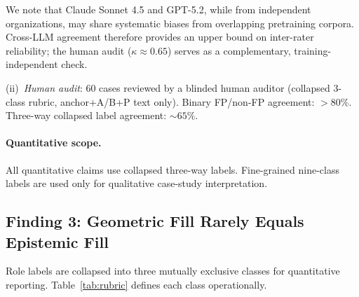 \documentclass[11pt,twocolumn]{article}
\begin{document}
We note that Claude Sonnet 4.5 and GPT-5.2, while from independent organizations,
may share systematic biases from overlapping pretraining corpora. Cross-LLM
agreement therefore provides an upper bound on inter-rater reliability; the human
audit ($\kappa\approx 0.65$) serves as a complementary, training-independent check.

(ii)~\emph{Human audit}: 60 cases reviewed by a blinded human auditor
(collapsed 3-class rubric, anchor+A/B+P text only). Binary FP/non-FP agreement:
$>80\%$. Three-way collapsed label agreement: $\sim65\%$.

\begin{table}[h!]
\centering\small
\caption{LLM annotation reliability (t5, n=100). Binary $\kappa$ suppressed by
2\% fill-class imbalance; 3-class $\kappa$ is primary metric.}
\end{table}

\paragraph{Quantitative scope.}
All quantitative claims use collapsed three-way labels. Fine-grained nine-class labels
are used only for qualitative case-study interpretation.

\subsection{Finding 3: Geometric Fill Rarely Equals Epistemic Fill}

Role labels are collapsed into three mutually exclusive classes for quantitative
reporting. Table~\ref{tab:rubric} defines each class operationally.
\end{document}
